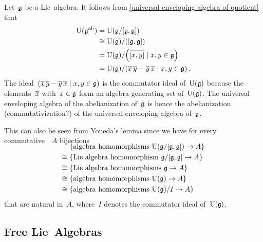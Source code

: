 \begin{example}
	Let~$\mathfrak{g}$ be a Lie~algebra.
	It follows from \cref{universal enveloping algebra of quotient} that
	\begin{align*}
		\Univ( \glie^{\ab} )
		&=
		\Univ( \glie/[\glie, \glie] )
		\\
		&\cong
		\Univ(\glie) / \ideal{[\glie, \glie]}
		\\
		&=
		\Univ(\glie)
		/
		\ideal[\Big]{ \class{[x,y]} \suchthat x, y \in \glie }
		\\
		&=
		\Univ(\glie)
		/
		\ideal{
			\class{x} \, \class{y} - \class{y} \, \class{x}
		\suchthat
			x, y \in \glie
		} \,.
	\end{align*}
	The ideal~$\ideal{ \class{x} \, \class{y} - \class{y} \, \class{x} \suchthat x, y \in \glie }$ is the commutator ideal of~$\operatorname{U}(\mathfrak{g})$ because the elements~$\overline{x}$ with~$x \in \mathfrak{g}$ form an algebra generating set of~$\operatorname{U}(\mathfrak{g})$.
	The universal enveloping algebra of the abelianization of~$\mathfrak{g}$ is hence the abelianization (commutativization?) of the universal enveloping algebra of~$\mathfrak{g}$.
	
	This can also be seen from Yoneda’s lemma since we have for every commutative~{\algebra{$\kf$}}~$A$ bijections
	\begin{align*}
		\SwapAboveDisplaySkip
		{}&
		\{ \textstyle\text{algebra homomorphisms~$\Univ(\glie/[\glie,\glie]) \to A$} \}
		\\
		\cong{}&
		\{ \textstyle\text{Lie~algebra homomorphism~$\glie/[\glie, \glie] \to A$} \}
		\\
		\cong{}&
		\{ \textstyle\text{Lie~algebra homomorphisms~$\glie \to A$} \}
		\\
		\cong{}&
		\{ \textstyle\text{algebra homomorphisms~$\Univ(\glie) \to A$} \}
		\\
		\cong{}&
		\{ \textstyle\text{algebra homomorphisms~$\Univ(\glie)/I \to A$} \}
	\end{align*}
	that are natural in~$A$, where~$I$ denotes the commutator ideal of~$\operatorname{U}(\mathfrak{g})$.
\end{example}





\subsection{Free Lie~Algebras}
\label{uea of free lie algebra}


